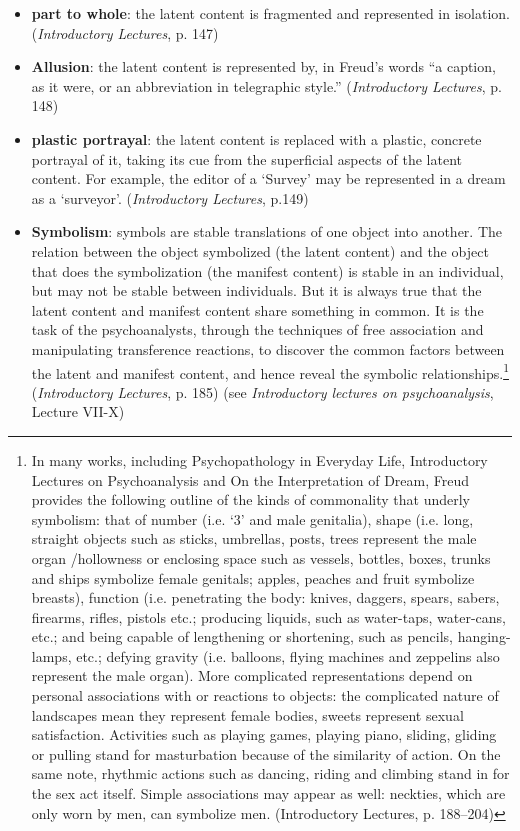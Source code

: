 \begin{itemize}
\item \textbf{part to whole}: the latent content is fragmented and represented in isolation. (\emph{Introductory Lectures}, p. 147)

\item \textbf{Allusion}: the latent content is represented by, in Freud's words ``a caption, as it were, or an abbreviation in telegraphic style.'' (\emph{Introductory Lectures}, p. 148)

\item \textbf{plastic portrayal}: the latent content is replaced with a plastic, concrete portrayal of it, taking its cue from the superficial aspects of the latent content. For example, the editor of a `Survey' may be represented in a dream as a `surveyor'. (\emph{Introductory Lectures}, p.149)

\item \textbf{Symbolism}: symbols are stable translations of one object into another. The relation between the object symbolized (the latent content) and the object that does the symbolization (the manifest content) is stable in an individual, but may not be stable between individuals. But it is always true that the latent content and manifest content share something in common. It is the task of the psychoanalysts, through the techniques of free association and manipulating transference reactions, to discover the common factors between the latent and manifest content, and hence reveal the symbolic relationships.\footnote{In many works, including Psychopathology in Everyday Life, Introductory Lectures on Psychoanalysis and On the Interpretation of Dream, Freud provides the following outline of the kinds of commonality that underly symbolism: that of number (i.e. `3' and male genitalia), shape (i.e. long, straight objects such as sticks, umbrellas, posts, trees represent the male organ \slash  hollowness or enclosing space such as vessels, bottles, boxes, trunks and ships symbolize female genitals; apples, peaches and fruit symbolize breasts), function (i.e. penetrating the body: knives, daggers, spears, sabers, firearms, rifles, pistols etc.; producing liquids, such as water-taps, water-cans, etc.; and being capable of lengthening or shortening, such as pencils, hanging-lamps, etc.; defying gravity (i.e. balloons, flying machines and zeppelins also represent the male organ). More complicated representations depend on personal associations with or reactions to objects: the complicated nature of landscapes mean they represent female bodies, sweets represent sexual satisfaction. Activities such as playing games, playing piano, sliding, gliding or pulling stand for masturbation because of the similarity of action. On the same note, rhythmic actions such as dancing, riding and climbing stand in for the sex act itself. Simple associations may appear as well: neckties, which are only worn by men, can symbolize men. (Introductory Lectures, p. 188--204)} (\emph{Introductory Lectures}, p. 185)
(see \emph{Introductory lectures on psychoanalysis}, Lecture VII-X)

\end{itemize}

